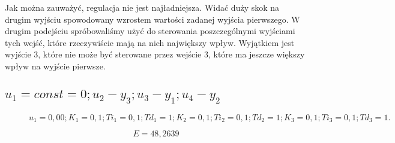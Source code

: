 
Jak można zauważyć, regulacja nie jest najładniejsza. Widać duży skok na drugim wyjściu spowodowany wzrostem wartości zadanej wyjścia pierwszego. W drugim podejściu spróbowaliśmy użyć do sterowania poszczególnymi wyjściami tych wejść, które rzeczywiście mają na nich największy wpływ. Wyjątkiem jest wyjście 3, które nie może być sterowane przez wejście 3, które ma jeszcze większy wpływ na wyjście pierwsze.

\subsection{$u_1 = const = 0; u_2 - y_3; u_3 - y_1; u_4 - y_2$}

%     



\begin{figure}[H]
    \centering
    
    \caption{$u_1 = 0,00; K_1 = 0,1; Ti_1 = 0,1; Td_1 = 1; K_2 = 0,1; Ti_2 = 0,1; Td_2 = 1; K_3 = 0,1; Ti_3 = 0,1; Td_3 = 1.$}
\end{figure}

\begin{equation}
    E = 48,2639
\end{equation}


%     

